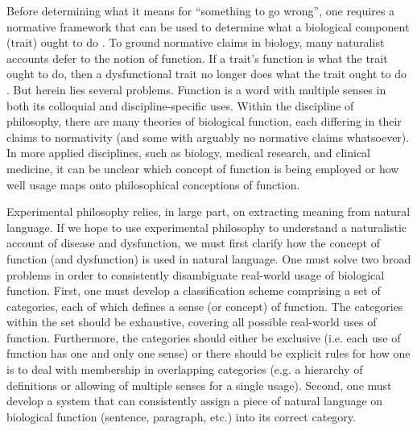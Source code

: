 \documentclass{article}
\begin{document}
Before determining what it means for ``something to go wrong'', one requires a normative framework that can be used to determine what a biological component (trait) ought to do  .
To ground normative claims in biology, many naturalist accounts defer to the notion of function.
If a trait's function is what the trait ought to do, then a dysfunctional trait no longer does what the trait ought to do \cite{neander1995}.
But herein lies several problems.
Function is a word with multiple senses in both its colloquial and discipline-specific uses.
Within the discipline of philosophy, there are many theories of biological function, each differing in their claims to normativity (and some with arguably no normative claims whatsoever).
In more applied disciplines, such as biology, medical research, and clinical medicine, it can be unclear which concept of function is being employed or how well usage maps onto philosophical conceptions of function.

Experimental philosophy relies, in large part, on extracting meaning from natural language.
If we hope to use experimental philosophy to understand a naturalistic account of disease and dysfunction, we must first clarify how the concept of function (and dysfunction) is used in natural language.
One must solve two broad problems in order to consistently disambiguate real-world usage of biological function.
First, one must develop a classification scheme comprising a set of categories, each of which defines a sense (or concept) of function.
The categories within the set should be exhaustive, covering all possible real-world uses of function.
Furthermore, the categories should either be exclusive (i.e. each use of function has one and only one sense) or there should be explicit rules for how one is to deal with membership in overlapping categories (e.g. a hierarchy of definitions or allowing of multiple senses for a single usage). 
Second, one must develop a system that can consistently assign a piece of natural language on biological function (sentence, paragraph, etc.) into its correct category.
\end{document}
